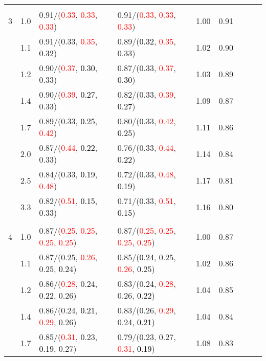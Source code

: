 \documentclass[10pt,a4paper]{report}
\begin{document}
\begin{table}[!htbp]
\begin{center}
{\begin{tabular}{ccllccccc}
			&&&&\\
			3			&1.0&0.91/(\textcolor{red}{0.33}, \textcolor{red}{0.33}, \textcolor{red}{0.33})&0.91/(\textcolor{red}{0.33}, \textcolor{red}{0.33}, \textcolor{red}{0.33})&1.00&0.91\\
			&1.1&0.91/(0.33, \textcolor{red}{0.35}, \textcolor{black}{0.32})&0.89/(\textcolor{black}{0.32}, \textcolor{red}{0.35}, 0.33)&1.02&0.90\\
			&1.2&0.90/(\textcolor{red}{0.37}, \textcolor{black}{0.30}, 0.33)&0.87/(0.33, \textcolor{red}{0.37}, \textcolor{black}{0.30})&1.03&0.89\\
			&1.4&0.90/(\textcolor{red}{0.39}, \textcolor{black}{0.27}, 0.33)&0.82/(0.33, \textcolor{red}{0.39}, \textcolor{black}{0.27})&1.09&0.87\\
			&1.7&0.89/(0.33, \textcolor{black}{0.25}, \textcolor{red}{0.42})&0.80/(0.33, \textcolor{red}{0.42}, \textcolor{black}{0.25})&1.11&0.86\\
			&2.0&0.87/(\textcolor{red}{0.44}, \textcolor{black}{0.22}, 0.33)&0.76/(0.33, \textcolor{red}{0.44}, \textcolor{black}{0.22})&1.14&0.84\\
			&2.5&0.84/(0.33, \textcolor{black}{0.19}, \textcolor{red}{0.48})&0.72/(0.33, \textcolor{red}{0.48}, \textcolor{black}{0.19})&1.17&0.81\\
			&3.3&0.82/(\textcolor{red}{0.51}, \textcolor{black}{0.15}, 0.33)&0.71/(0.33, \textcolor{red}{0.51}, \textcolor{black}{0.15})&1.16&0.80\\
			&&&&\\
			4			&1.0&0.87/(\textcolor{red}{0.25}, \textcolor{red}{0.25}, \textcolor{red}{0.25}, \textcolor{red}{0.25})&0.87/(\textcolor{red}{0.25}, \textcolor{red}{0.25}, \textcolor{red}{0.25}, \textcolor{red}{0.25})&1.00&0.87\\
			&1.1&0.87/(0.25, \textcolor{red}{0.26}, 0.25, \textcolor{black}{0.24})&0.85/(\textcolor{black}{0.24}, 0.25, \textcolor{red}{0.26}, 0.25)&1.02&0.86\\
			&1.2&0.86/(\textcolor{red}{0.28}, 0.24, \textcolor{black}{0.22}, 0.26)&0.83/(0.24, \textcolor{red}{0.28}, 0.26, \textcolor{black}{0.22})&1.04&0.85\\
			&1.4&0.86/(0.24, \textcolor{black}{0.21}, \textcolor{red}{0.29}, 0.26)&0.83/(0.26, \textcolor{red}{0.29}, 0.24, \textcolor{black}{0.21})&1.04&0.84\\
			&1.7&0.85/(\textcolor{red}{0.31}, 0.23, \textcolor{black}{0.19}, 0.27)&0.79/(0.23, 0.27, \textcolor{red}{0.31}, \textcolor{black}{0.19})&1.08&0.83\\

\end{tabular}}
\end{center}
\end{table}
\end{document}
